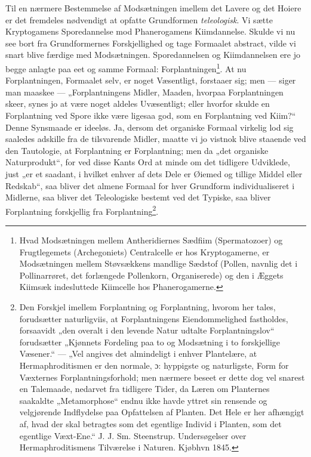 \documentclass[11pt]{book}
\newcommand{\opage}[1]{\marginnote{\footnotesize\textit{[#1]}}}
\begin{document}
Til en nærmere Bestemmelse af Modsætningen imellem det Lavere og det
Hoiere er det fremdeles nødvendigt at opfatte Grundformen
\emph{teleologisk}. Vi sætte Kryptogamens Sporedannelse mod
Phanerogamens Kiimdannelse. Skulde vi nu see bort fra Grundformernes
Forskjellighed og tage Formaalet abstract, vilde vi snart blive færdige
med Modsætningen. Sporedannelsen og Kiimdannelsen ere jo begge anlagte
paa eet og samme Formaal:
Forplantningen\footnote{%
Hvad Modsætningen mellem Antheridiernes Sædfiim (Spermatozoer) og
Frugtlegemets (Archegoniets) Centralcelle er hos Kryptogamerne, er
Modsætningen mellem Støvsækkens mandlige Sædstof (Pollen, navnlig det i
Pollinarrøret, det forlængede Pollenkorn, Organiserede) og den i Æggets
Kiimsæk indesluttede Kiimcelle hos Phanerogamerne.
}. At
\opage{296} \setcounter{footnote}{0}%
nu Forplantningen, Formaalet selv, er noget Væsentligt, forstaaer sig;
men --- siger man maaskee --- „Forplantningens Midler, Maaden, hvorpaa
Forplantningen skeer, synes jo at være noget aldeles Uvæsentligt; eller
hvorfor skulde en Forplantning ved Spore ikke være ligesaa god, som en
Forplantning ved Kiim?“ Denne Synsmaade er ideeløs. Ja, dersom det
organiske Formaal virkelig lod sig saaledes adskille fra de tilsvarende
Midler, maatte vi jo vistnok blive staaende ved den Tautologie, at
Forplantning er Forplantning; men da „det organiske Naturprodukt“, for
ved disse Kants Ord at minde om det tidligere Udviklede, just „er et
saadant, i hvilket enhver af dets Dele er Øiemed og tillige Middel eller
Redskab“, saa bliver det almene Formaal for hver Grundform
individualiseret i Midlerne, saa bliver det Teleologiske bestemt ved det
Typiske, saa bliver Forplantning forskjellig fra
Forplantning\footnote{%
Den Forskjel imellem Forplantning og Forplantning, hvorom her tales,
forudsætter naturligviis, at Forplantningens Eiendommelighed fastholdes,
forsaavidt „den overalt i den levende Natur udtalte Forplantningslov“
forudsætter „Kjønnets Fordeling paa to og Modsætning i to forskjellige
Væsener.“ --- „Vel angives det almindeligt i enhver Plantelære, at
Hermaphroditismen er den normale, ɔ: hyppigste og naturligste, Form for
Væxternes Forplantningsforhold; men nærmere beseet er dette dog vel
snarest en Talemaade, nedarvet fra tidligere Tider, da Læren om
Planternes saakaldte „Metamorphose“ endnu ikke havde yttret sin rensende
og velgjørende Indflydelse paa Opfattelsen af Planten. Det Hele er her
afhængigt af, hvad der skal betragtes som det egentlige Individ i
Planten, som det egentlige Væxt-Ene.“ J. J. Sm. Steenstrup.
Undersøgelser over Hermaphroditismens Tilværelse i Naturen. Kjøbhvn
1845.
}.
\end{document}
